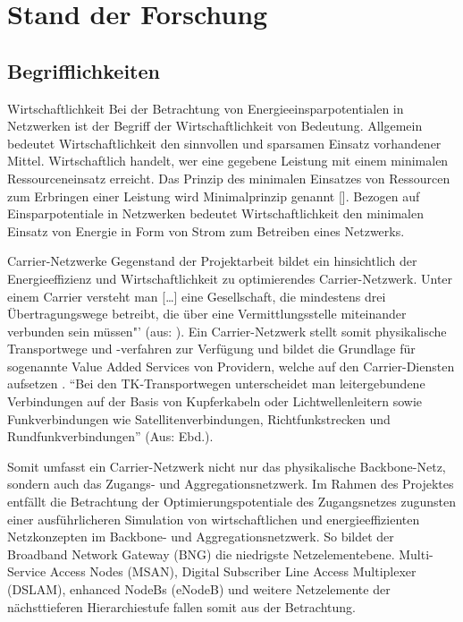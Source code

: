 \documentclass[12pt,titlepage]{article}
\begin{document}
\section{Stand der Forschung} \label{SdF}


\subsection{Begrifflichkeiten}
Wirtschaftlichkeit
Bei der Betrachtung von Energieeinsparpotentialen in Netzwerken ist der Begriff der Wirtschaftlichkeit von Bedeutung. Allgemein bedeutet Wirtschaftlichkeit den sinnvollen und sparsamen Einsatz vorhandener Mittel. Wirtschaftlich handelt, wer eine gegebene Leistung mit einem minimalen Ressourceneinsatz erreicht. Das Prinzip des minimalen Einsatzes von Ressourcen zum Erbringen einer Leistung wird Minimalprinzip genannt []. Bezogen auf Einsparpotentiale in Netzwerken bedeutet Wirtschaftlichkeit den minimalen Einsatz von Energie in Form von Strom zum Betreiben eines Netzwerks.


Carrier-Netzwerke
Gegenstand der Projektarbeit bildet ein hinsichtlich der Energieeffizienz und Wirtschaftlichkeit zu optimierendes Carrier-Netzwerk.
Unter einem Carrier versteht man […] eine Gesellschaft, die mindestens drei Übertra\-gungs\-wege betreibt, die über eine Vermittlungsstelle miteinander verbunden sein müssen"' (aus: \cite{carrier}). Ein Carrier-Netzwerk stellt somit physikalische Transportwege und -verfahren zur Verfügung und bildet die Grundlage für sogenannte Value Added Services von Providern, welche auf den Carrier-Diensten aufsetzen \cite{fassnacht}. "`Bei den TK-Transportwegen unterscheidet man leitergebundene Verbindungen auf der Basis von Kupferkabeln oder Lichtwellenleitern sowie Funkverbindungen wie Satellitenverbindungen, Richtfunkstrecken und Rundfunkverbindungen"' (Aus: Ebd.).%

Somit umfasst ein Carrier-Netzwerk nicht nur das physikalische Backbone-Netz, sondern auch das Zugangs- und Aggregationsnetzwerk. Im Rahmen des Projektes entfällt die Betrachtung der Optimierungspotentiale des Zugangsnetzes zugunsten einer aus\-führ\-lich\-eren Simulation von wirtschaftlichen und energieeffizienten Netzkonzepten im Backbone- und Aggregationsnetzwerk. So bildet der Broadband Network Gateway (BNG) die niedrigste Netzelementebene. Multi-Service Access Nodes (MSAN), Digital Subscriber Line Access Multiplexer (DSLAM), enhanced NodeBs (eNodeB) und weitere Netzelemente der nächsttieferen Hierarchiestufe fallen somit aus der Betrachtung.
\end{document}
